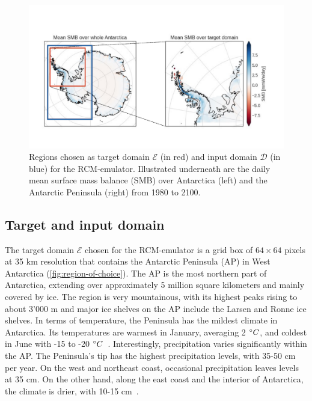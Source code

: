 \documentclass[a4paper,11pt,oneside]{report}
\begin{document}
\begin{figure}[!t]
  \centering
  \includegraphics[width=\columnwidth]{images/domains.pdf}
  \caption []{\small Regions chosen as target domain $\mathcal{E}$ (in red) and input domain $\mathcal{D}$ (in blue) for the RCM-emulator. Illustrated underneath are the daily mean surface mass balance (SMB) over Antarctica (left) and the Antarctic Peninsula (right) from 1980 to 2100.}
  \vspace{-3mm}
    \label{fig:region-of-choice}
\end{figure}


\subsection{Target and input domain}
The target domain $\mathcal{E}$ chosen for the RCM-emulator is a grid box of $64 \times 64$ pixels at 35 \si{km} resolution that contains the Antarctic Peninsula (AP) in West Antarctica (\autoref{fig:region-of-choice}). The AP is the most northern part of Antarctica, extending over approximately 5 million square kilometers and mainly covered by ice. The region is very mountainous, with its highest peaks rising to about 3'000 \si{m} and major ice shelves on the AP include the Larsen and Ronne ice shelves. In terms of temperature, the Peninsula has the mildest climate in Antarctica. Its temperatures are warmest in January, averaging 2 $\degree C$, and coldest in June with -15 to -20 $\degree C$~\cite{AntarcticPeninsula}. Interestingly, precipitation varies significantly within the AP. The Peninsula's tip has the highest precipitation levels, with 35-50 \si{cm} per year. On the west and northeast coast, occasional precipitation leaves levels at 35 \si{cm}. On the other hand, along the east coast and the interior of Antarctica, the climate is drier, with 10-15 \si{cm}~\cite{antarctic-climate, antarctic-climate-2}. 
\end{document}
